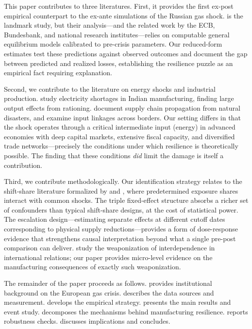 \documentclass[12pt]{article}
\begin{document}
This paper contributes to three literatures. First, it provides the first ex-post empirical counterpart to the ex-ante simulations of the Russian gas shock. \citet{bachmann2022} is the landmark study, but their analysis---and the related work by the ECB, Bundesbank, and national research institutes---relies on computable general equilibrium models calibrated to pre-crisis parameters. Our reduced-form estimates test these predictions against observed outcomes and document the gap between predicted and realized losses, establishing the resilience puzzle as an empirical fact requiring explanation.

Second, we contribute to the literature on energy shocks and industrial production. \citet{allcott2016} study electricity shortages in Indian manufacturing, finding large output effects from rationing. \citet{barrot2016} document supply chain propagation from natural disasters, and \citet{boehm2019} examine input linkages across borders. Our setting differs in that the shock operates through a critical intermediate input (energy) in advanced economies with deep capital markets, extensive fiscal capacity, and diversified trade networks---precisely the conditions under which resilience is theoretically possible. The finding that these conditions \textit{did} limit the damage is itself a contribution.

Third, we contribute methodologically. Our identification strategy relates to the shift-share literature formalized by \citet{goldsmith2020} and \citet{borusyak2022}, where predetermined exposure shares interact with common shocks. The triple fixed-effect structure absorbs a richer set of confounders than typical shift-share designs, at the cost of statistical power. The escalation design---estimating separate effects at different cutoff dates corresponding to physical supply reductions---provides a form of dose-response evidence that strengthens causal interpretation beyond what a single pre-post comparison can deliver. \citet{farrell2019} study the weaponization of interdependence in international relations; our paper provides micro-level evidence on the manufacturing consequences of exactly such weaponization.

The remainder of the paper proceeds as follows.  provides institutional background on the European gas crisis.  describes the data sources and measurement.  develops the empirical strategy.  presents the main results and event study.  decomposes the mechanisms behind manufacturing resilience.  reports robustness checks.  discusses implications and concludes.
\end{document}
